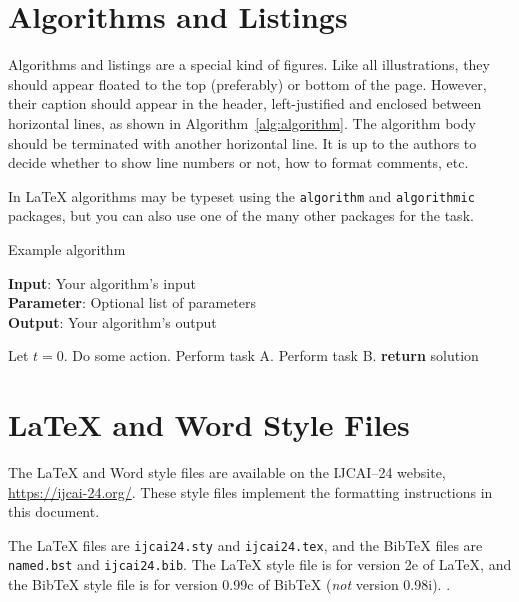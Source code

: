 \documentclass{article}
\begin{document}
\section{Algorithms and Listings}

Algorithms and listings are a special kind of figures. Like all illustrations, they should appear floated to the top (preferably) or bottom of the page. However, their caption should appear in the header, left-justified and enclosed between horizontal lines, as shown in Algorithm~\ref{alg:algorithm}. The algorithm body should be terminated with another horizontal line. It is up to the authors to decide whether to show line numbers or not, how to format comments, etc.

In \LaTeX{} algorithms may be typeset using the {\tt algorithm} and {\tt algorithmic} packages, but you can also use one of the many other packages for the task.

\begin{algorithm}[tb]
    \caption{Example algorithm}
    \label{alg:algorithm}
    \textbf{Input}: Your algorithm's input\\
    \textbf{Parameter}: Optional list of parameters\\
    \textbf{Output}: Your algorithm's output
    \begin{algorithmic}[1] %
        \STATE Let $t=0$.
        \STATE Do some action.
        \STATE Perform task A.
        \ELSE
        \STATE Perform task B.
        \ENDIF
        \ENDWHILE
        \STATE \textbf{return} solution
    \end{algorithmic}
\end{algorithm}

\section{\LaTeX{} and Word Style Files}\label{stylefiles}

The \LaTeX{} and Word style files are available on the IJCAI--24
website, \url{https://ijcai-24.org/}.
These style files implement the formatting instructions in this
document.

The \LaTeX{} files are {\tt ijcai24.sty} and {\tt ijcai24.tex}, and
the Bib\TeX{} files are {\tt named.bst} and {\tt ijcai24.bib}. The
\LaTeX{} style file is for version 2e of \LaTeX{}, and the Bib\TeX{}
style file is for version 0.99c of Bib\TeX{} ({\em not} version
0.98i). .
\end{document}
